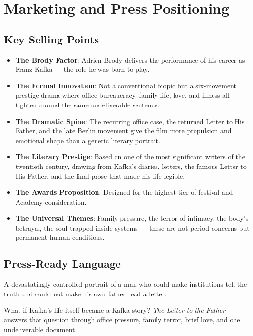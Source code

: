 
\section{Marketing and Press Positioning}

\subsection{Key Selling Points}

\begin{itemize}[leftmargin=*]
\item \textbf{The Brody Factor}: Adrien Brody delivers the performance of his career as Franz Kafka --- the role he was born to play.
\item \textbf{The Formal Innovation}: Not a conventional biopic but a six-movement prestige drama where office bureaucracy, family life, love, and illness all tighten around the same undeliverable sentence.
\item \textbf{The Dramatic Spine}: The recurring office case, the returned Letter to His Father, and the late Berlin movement give the film more propulsion and emotional shape than a generic literary portrait.
\item \textbf{The Literary Prestige}: Based on one of the most significant writers of the twentieth century, drawing from Kafka's diaries, letters, the famous Letter to His Father, and the final prose that made his life legible.
\item \textbf{The Awards Proposition}: Designed for the highest tier of festival and Academy consideration.
\item \textbf{The Universal Themes}: Family pressure, the terror of intimacy, the body's betrayal, the soul trapped inside systems --- these are not period concerns but permanent human conditions.
\end{itemize}

\subsection{Press-Ready Language}

\begin{pullquote}
A devastatingly controlled portrait of a man who could make institutions tell the truth and could not make his own father read a letter.
\end{pullquote}

\begin{pullquote}
What if Kafka's life itself became a Kafka story? \textit{The Letter to the Father} answers that question through office pressure, family terror, brief love, and one undeliverable document.
\end{pullquote}

